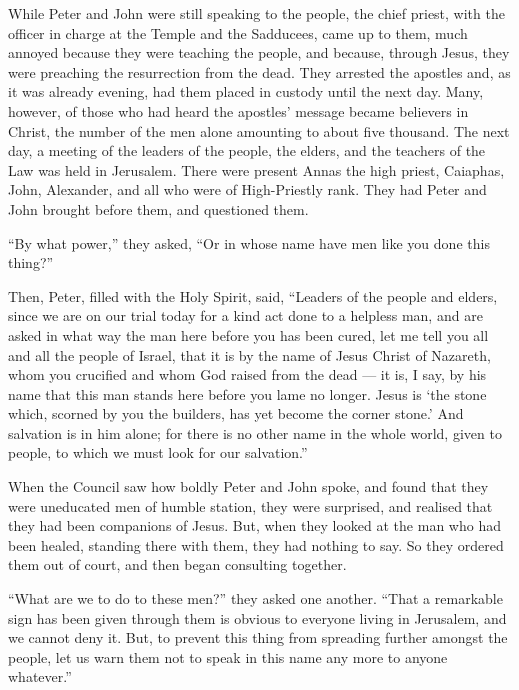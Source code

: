  While Peter and John were still speaking to the people, the
chief priest, with the officer in charge at the Temple and the
Sadducees, came up to them,  much annoyed because they were
teaching the people, and because, through Jesus, they were preaching the
resurrection from the dead.  They arrested the apostles and,
as it was already evening, had them placed in custody until the next
day.  Many, however, of those who had heard the apostles'
message became believers in Christ, the number of the men alone
amounting to about five thousand.  The next day, a meeting
of the leaders of the people, the elders, and the teachers of the Law
was held in Jerusalem.  There were present Annas the high
priest, Caiaphas, John, Alexander, and all who were of High-Priestly
rank.  They had Peter and John brought before them, and
questioned them.

``By what power,'' they asked, ``Or in whose name have men like you done
this thing?''

 Then, Peter, filled with the Holy Spirit, said, ``Leaders
of the people and elders,  since we are on our trial today
for a kind act done to a helpless man, and are asked in what way the man
here before you has been cured,  let me tell you all and
all the people of Israel, that it is by the name of Jesus Christ of
Nazareth, whom you crucified and whom God raised from the dead --- it
is, I say, by his name that this man stands here before you lame no
longer.  Jesus is `the stone which, scorned by you the
builders, has yet become the corner stone.'  And salvation
is in him alone; for there is no other name in the whole world, given to
people, to which we must look for our salvation.''

 When the Council saw how boldly Peter and John spoke, and
found that they were uneducated men of humble station, they were
surprised, and realised that they had been companions of Jesus.
 But, when they looked at the man who had been healed,
standing there with them, they had nothing to say.  So they
ordered them out of court, and then began consulting together.

 ``What are we to do to these men?'' they asked one
another. ``That a remarkable sign has been given through them is obvious
to everyone living in Jerusalem, and we cannot deny it. 
But, to prevent this thing from spreading further amongst the people,
let us warn them not to speak in this name any more to anyone
whatever.''

